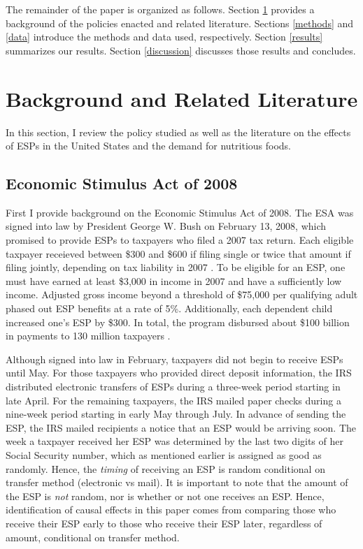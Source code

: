 \documentclass[12pt]{article}
\begin{document}
The remainder of the paper is organized as follows.
Section \ref{background} provides a background of the policies enacted and related literature.
Sections \ref{methods} and \ref{data} introduce the methods and data used, respectively.
Section \ref{results} summarizes our results.
Section \ref{discussion} discusses those results and concludes.

\section{Background and Related Literature} \label{background}

In this section, I review the policy studied as well as the literature on the effects of ESPs in the United States and the demand for nutritious foods.

\subsection{Economic Stimulus Act of 2008} \label{2008esa}

First I provide background on the Economic Stimulus Act of 2008.
The ESA was signed into law by President George W.
Bush on February 13, 2008, which promised to provide ESPs to taxpayers who filed a 2007 tax return.
Each eligible taxpayer receieved between \$300 and \$600 if filing single or twice that amount if filing jointly, depending on tax liability in 2007 \parencite{house2008}.
To be eligible for an ESP, one must have earned at least \$3,000 in income in 2007 and have a sufficiently low income.
Adjusted gross income beyond a threshold of \$75,000 per qualifying adult phased out ESP benefits at a rate of 5\%.
Additionally, each dependent child increased one's ESP by \$300.
In total, the program disbursed about \$100 billion in payments to 130 million taxpayers \parencite{parker2013consumer}.

Although signed into law in February, taxpayers did not begin to receive ESPs until May.
For those taxpayers who provided direct deposit information, the IRS distributed electronic transfers of ESPs during a three-week period starting in late April.
For the remaining taxpayers, the IRS mailed paper checks during a nine-week period starting in early May through July.
In advance of sending the ESP, the IRS mailed recipients a notice that an ESP would be arriving soon.
The week a taxpayer received her ESP was determined by the last two digits of her Social Security number, which as mentioned earlier is assigned as good as randomly.
Hence, the \textit{timing} of receiving an ESP is random conditional on transfer method (electronic vs mail).
It is important to note that the amount of the ESP is \textit{not} random, nor is whether or not one receives an ESP.
Hence, identification of causal effects in this paper comes from comparing those who receive their ESP early to those who receive their ESP later, regardless of amount, conditional on transfer method.
\end{document}
